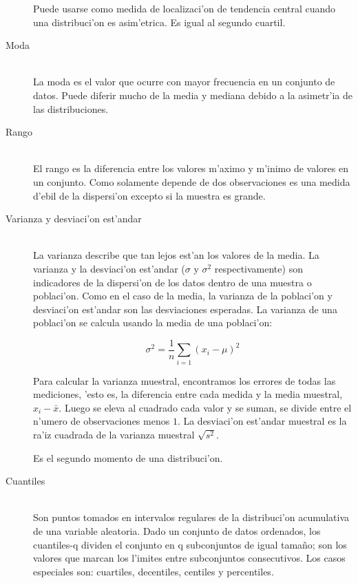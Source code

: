 \begin{description}
Puede usarse como medida de localizaci'on de tendencia central cuando una distribuci'on es asim'etrica. Es igual al segundo cuartil.
\item [Moda] \hfill \\
La moda es el valor que ocurre con mayor frecuencia en un conjunto de datos. Puede diferir mucho de la media y mediana debido a la asimetr'ia de las distribuciones.
\item [Rango] \hfill \\
El rango es la diferencia entre los valores m'aximo y m'inimo de valores en un conjunto. Como solamente depende de dos observaciones es una medida d'ebil de la dispersi'on excepto si la muestra es grande.

\item [Varianza y desviaci'on est'andar] \hfill \\
La varianza describe que tan lejos est'an los valores de la media. La varianza y la desviaci'on est'andar ($\sigma$ y $\sigma^2$ respectivamente) son indicadores de la dispersi'on de los datos dentro de una muestra o poblaci'on. Como en el caso de la media, la varianza de la poblaci'on y desviaci'on est'andar son las desviaciones esperadas. La varianza de una poblaci'on se calcula usando la media de una poblaci'on:

\[
    \sigma^2 = \frac{1}{n}\sum_{i=1}{(x_i - \mu)}^2
\]

Para calcular la varianza muestral, encontramos los errores de todas las mediciones, 'esto es, la diferencia entre cada medida y la media muestral, $x_i - \bar{x}$. Luego se eleva al cuadrado cada valor y se suman, se divide entre el n'umero de observaciones menos $1$. La desviaci'on est'andar muestral es la ra'iz cuadrada de la varianza muestral $\sqrt{s^2}$. %

Es el segundo momento de una distribuci'on.


\item [Cuantiles] \hfill \\
Son puntos tomados en intervalos regulares de la distribuci'on acumulativa de una variable aleatoria. Dado un conjunto de datos ordenados, los cuantiles-q dividen el conjunto en q subconjuntos de igual tama\~{n}o; son los valores que marcan los l'imites entre subconjuntos consecutivos. Los casos especiales son: cuartiles, decentiles, centiles y percentiles.


\end{description}
